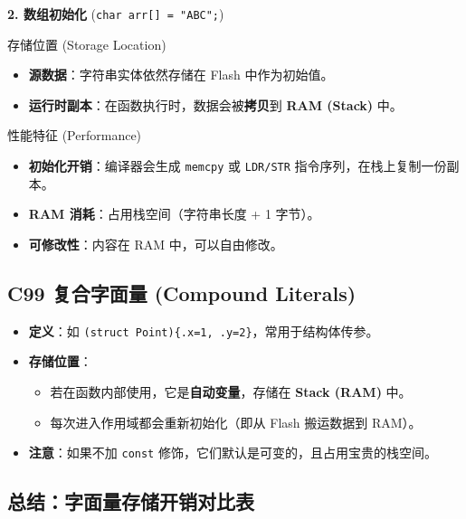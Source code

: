 \textbf{2. 数组初始化} (\texttt{char arr[] = "ABC";})

    存储位置 (Storage Location)

    \begin{itemize}
        \item \textbf{源数据}：字符串实体依然存储在 Flash 中作为初始值。
        \item \textbf{运行时副本}：在函数执行时，数据会被\textbf{拷贝}到 \textbf{RAM (Stack)} 中。
    \end{itemize}

    性能特征 (Performance)

    \begin{itemize}
        \item \textbf{初始化开销}：编译器会生成 \texttt{memcpy} 或 \texttt{LDR/STR} 指令序列，在栈上复制一份副本。
        \item \textbf{RAM 消耗}：占用栈空间（字符串长度 + 1 字节）。
        \item \textbf{可修改性}：内容在 RAM 中，可以自由修改。
    \end{itemize}

\subsection{C99 复合字面量 (Compound Literals)}

\begin{itemize}
    \item \textbf{定义}：如 \texttt{(struct Point)\{.x=1, .y=2\}}，常用于结构体传参。
    \item \textbf{存储位置}：
    \begin{itemize}
        \item 若在函数内部使用，它是\textbf{自动变量}，存储在 \textbf{Stack (RAM)} 中。
        \item 每次进入作用域都会重新初始化（即从 Flash 搬运数据到 RAM）。
    \end{itemize}
    \item \textbf{注意}：如果不加 \texttt{const} 修饰，它们默认是可变的，且占用宝贵的栈空间。
\end{itemize}

\subsection{总结：字面量存储开销对比表}

